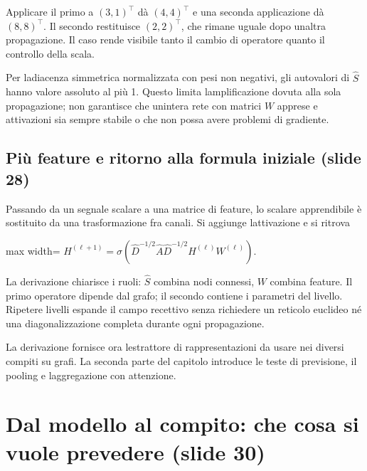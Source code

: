 \documentclass[11pt,a4paper,oneside,openany]{book}
\begin{document}
Applicare il primo a \((3,1)^\top\) dà \((4,4)^\top\) e una seconda applicazione dà \((8,8)^\top\). Il secondo restituisce \((2,2)^\top\), che rimane uguale dopo un\textquotesingle altra propagazione. Il caso rende visibile tanto il cambio di operatore quanto il controllo della scala.

Per l\textquotesingle adiacenza simmetrica normalizzata con pesi non negativi, gli autovalori di \(\widehat S\) hanno valore assoluto al più 1. Questo limita l\textquotesingle amplificazione dovuta alla sola propagazione; non garantisce che un\textquotesingle intera rete con matrici \(W\) apprese e attivazioni sia sempre stabile o che non possa avere problemi di gradiente.

\subsection{Più feature e ritorno alla formula iniziale (slide 28)}\label{f05-r535}

Passando da un segnale scalare a una matrice di feature, lo scalare apprendibile è sostituito da una trasformazione fra canali. Si aggiunge l\textquotesingle attivazione e si ritrova

\begin{center}
\begin{adjustbox}{max width=\linewidth}
$\displaystyle \boxed{H^{(\ell+1)}=\sigma\left(\widehat D^{-1/2}\widehat A\widehat D^{-1/2}H^{(\ell)}W^{(\ell)}\right).}$
\end{adjustbox}
\end{center}

La derivazione chiarisce i ruoli: \(\widehat S\) combina nodi connessi, \(W\) combina feature. Il primo operatore dipende dal grafo; il secondo contiene i parametri del livello. Ripetere livelli espande il campo recettivo senza richiedere un reticolo euclideo né una diagonalizzazione completa durante ogni propagazione.

La derivazione fornisce ora l\textquotesingle estrattore di rappresentazioni da usare nei diversi compiti su grafi. La seconda parte del capitolo introduce le teste di previsione, il pooling e l\textquotesingle aggregazione con attenzione.

\section{Dal modello al compito: che cosa si vuole prevedere (slide 30)}\label{f05-n30-r558}
\end{document}
